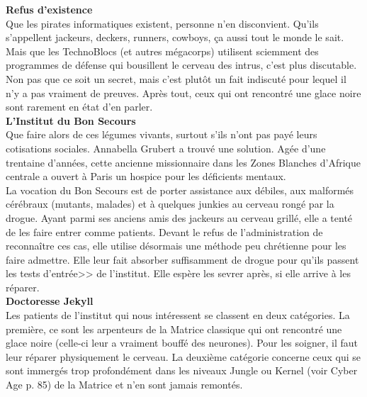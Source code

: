 \documentclass[11pt,twoside,a4paper]{article}
\begin{document}
\begin{multicols}{2}
\footnotesize{

\textbf{\Large Refus d'existence}~\\

Que les pirates informatiques existent, personne n'en disconvient. Qu'ils s'appellent jackeurs, deckers, runners, cowboys, \c{c}a aussi tout le monde le sait. Mais que les TechnoBlocs (et autres m{\'e}gacorps) utilisent sciemment des programmes de d{\'e}fense qui bousillent le cerveau des intrus, c'est plus discutable. Non pas que ce soit un secret, mais c'est plut{\^o}t un fait indiscut{\'e} pour lequel il n'y a pas vraiment de preuves. Apr{\`e}s tout, ceux qui ont rencontr{\'e} une glace noire sont rarement en {\'e}tat d'en parler.~\\

\textbf{\Large L'Institut du Bon Secours}~\\

Que faire alors de ces l{\'e}gumes vivants, surtout s'ils n'ont pas pay{\'e} leurs cotisations sociales. Annabella Grubert a trouv{\'e} une solution. Ag{\'e}e d'une trentaine d'ann{\'e}es, cette ancienne missionnaire dans les Zones Blanches d'Afrique centrale a ouvert {\`a} Paris un hospice pour les d{\'e}ficients mentaux.~\\

La vocation du Bon Secours est de porter assistance aux d{\'e}biles, aux malform{\'e}s c{\'e}r{\'e}braux (mutants, malades) et {\`a} quelques junkies au cerveau rong{\'e} par la drogue. Ayant parmi ses anciens amis des jackeurs au cerveau grill{\'e}, elle a tent{\'e} de les faire entrer comme patients. Devant le refus de l'administration de reconna{\^i}tre ces cas, elle utilise d{\'e}sormais une m{\'e}thode peu chr{\'e}tienne pour les faire admettre. Elle leur fait absorber suffisamment de drogue pour qu'ils passent les tests d'entr{\'e}e>> de l'institut. Elle esp{\`e}re les sevrer apr{\`e}s, si elle arrive {\`a} les r{\'e}parer.~\\

\textbf{\Large Doctoresse Jekyll}~\\

Les patients de l'institut qui nous int{\'e}ressent se classent en deux cat{\'e}gories. La premi{\`e}re, ce sont les arpenteurs de la Matrice classique qui ont rencontr{\'e} une glace noire (celle-ci leur a vraiment bouff{\'e} des neurones). Pour les soigner, il faut leur r{\'e}parer physiquement le cerveau. La deuxi{\`e}me cat{\'e}gorie concerne ceux qui se sont immerg{\'e}s trop profond{\'e}ment dans les niveaux Jungle ou Kernel (voir Cyber Age p. 85) de la Matrice et n'en sont jamais remont{\'e}s.~\\

}
\end{multicols}
\end{document}
